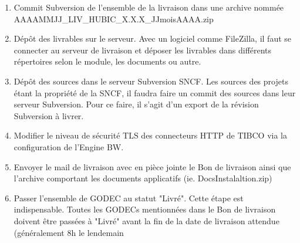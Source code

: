 \begin{enumerate}
\item Commit Subversion de l'ensemble de la livraison dans une archive nommée AAAAMMJJ\_LIV\_HUBIC\_X.X.X\_JJmoisAAAA.zip \item Dépôt des livrables sur le serveur. Avec un logiciel comme FileZilla, il faut se connecter au serveur de livraison et déposer les livrables dans différents répertoires selon le module, les documents ou autre.
\item Dépôt des sources dans le serveur Subversion SNCF. Les sources des projets étant la propriété de la SNCF, il faudra faire un commit des sources dans leur serveur Subversion. Pour ce faire, il s'agit d'un export de la révision Subversion à livrer.\item Modifier le niveau de sécurité TLS des connecteurs HTTP de TIBCO via la configuration de l'Engine BW.\item Envoyer le mail de livraison avec en pièce jointe le Bon de livraison ainsi que l'archive comportant les documents applicatifs (ie. DocsInstalaltion.zip) \item Passer l'ensemble de GODEC au statut "Livré". Cette étape est indispensable. Toutes les GODECs mentionnées dans le Bon de livraison doivent être passées à "Livré" avant la fin de la date de livraison attendue (généralement 8h le lendemain
\end{enumerate}

